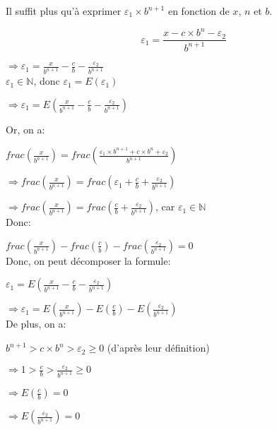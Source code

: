 \documentclass[a4paper, 12pt]{article}
\begin{document}
Il suffit plus qu'à exprimer $\varepsilon_{1} \times b^{n+1}$ en fonction de $x$, $n$ et $b$.

\[
\varepsilon_{1} = \frac{x - c \times b^{n} - \varepsilon_{2}}{b^{n+1}}
\]

$\Rightarrow \varepsilon_{1} =
\frac{x}{b^{n+1}} - \frac{c}{b} - \frac{\varepsilon_{2}}{b^{n+1}}$ \\

$\varepsilon_{1} \in \mathbb{N}$, donc $\varepsilon_{1} = E \left( \varepsilon_{1} \right)$

$\Rightarrow \varepsilon_{1} =
E \left( \frac{x}{b^{n+1}} - \frac{c}{b} - \frac{\varepsilon_{2}}{b^{n+1}} \right)$ \\

\newpage

Or, on a:

$frac \left( \frac{x}{b^{n+1}} \right) =
frac \left( \frac{\varepsilon_{1} \times b^{n + 1} + c \times b^{n} + \varepsilon_{2}}{b^{n+1}} \right)$

$\Rightarrow frac \left( \frac{x}{b^{n+1}} \right) =
frac \left( \varepsilon_{1} + \frac{c}{b} + \frac{\varepsilon_{2}}{b^{n+1}} \right)$

$\Rightarrow frac \left( \frac{x}{b^{n+1}} \right) =
frac \left( \frac{c}{b} + \frac{\varepsilon_{2}}{b^{n+1}} \right)$, car
$\varepsilon_{1} \in \mathbb{N}$ \\

Donc:

$frac \left( \frac{x}{b^{n+1}} \right) -
frac \left( \frac{c}{b} \right) - 
frac \left( \frac{\varepsilon_{2}}{b^{n+1}} \right) = 0$ \\

Donc, on peut décomposer la formule:

$\varepsilon_{1} =
E \left( \frac{x}{b^{n+1}} - \frac{c}{b} - \frac{\varepsilon_{2}}{b^{n+1}} \right)$

$\Rightarrow \varepsilon_{1} =
E \left( \frac{x}{b^{n+1}} \right) -
E \left( \frac{c}{b} \right) - 
E \left( \frac{\varepsilon_{2}}{b^{n+1}} \right)$ \\

De plus, on a:

$b^{n+1} > c \times b^{n} > \varepsilon_{2} \geqslant 0$ (d'après leur définition)

$\Rightarrow 1 > \frac{c}{b} > \frac{\varepsilon_{2}}{b^{n+1}} \geqslant 0$

$\Rightarrow E \left( \frac{c}{b} \right) = 0$

$\Rightarrow E \left( \frac{\varepsilon_{2}}{b^{n+1}} \right) = 0$ \\
\end{document}
